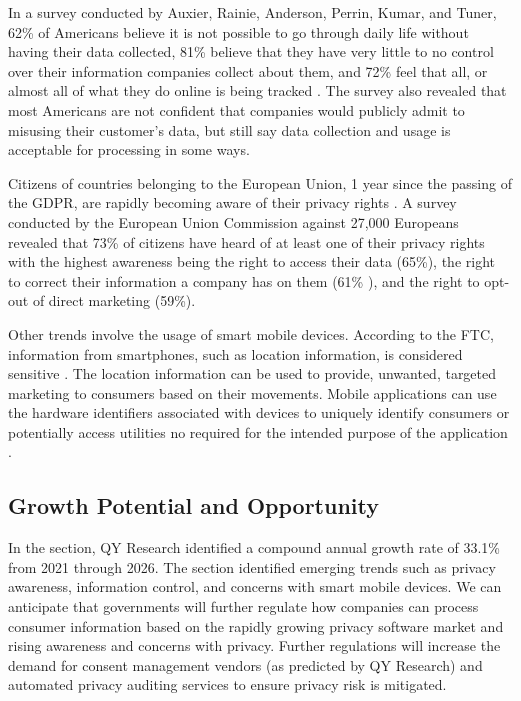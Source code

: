 In a survey conducted by Auxier, Rainie, Anderson, Perrin, Kumar, and Tuner, 62\% of Americans believe it is not possible to go through daily life without having their data collected, 81\% believe that they have very little to no control over their information companies collect about them, and 72\% feel that all, or almost all of what they do online is being tracked \cite{pewresearch.2019}. The survey also revealed that most Americans are not confident that companies would publicly admit to misusing their customer's data, but still say data collection and usage is acceptable for processing in some ways.

Citizens of countries belonging to the European Union, 1 year since the passing of the GDPR, are rapidly becoming aware of their privacy rights \cite{eucomm.2019}. A survey conducted by the European Union Commission against 27,000 Europeans revealed that 73\% of citizens have heard of at least one of their privacy rights with the highest awareness being the right to access their data (65\%), the right to correct their information a company has on them (61\% ), and the right to opt-out of direct marketing (59\%).

Other trends involve the usage of smart mobile devices. According to the FTC, information from smartphones, such as location information, is considered sensitive \cite{ftc.mobile.2012}. The location information can be used to provide, unwanted, targeted marketing to consumers based on their movements. Mobile applications can use the hardware identifiers associated with devices to uniquely identify consumers or potentially access utilities no required for the intended purpose of the application \cite{tama.mobile.2012}.

\subsection{Growth Potential and Opportunity}

In the  section, QY Research identified a compound annual growth rate of 33.1\% from 2021 through 2026. The  section identified emerging trends such as privacy awareness, information control, and concerns with smart mobile devices. We can anticipate that governments will further regulate how companies can process consumer information based on the rapidly growing privacy software market and rising awareness and concerns with privacy. Further regulations will increase the demand for consent management vendors (as predicted by QY Research) and  automated privacy auditing services to ensure privacy risk is mitigated. 

